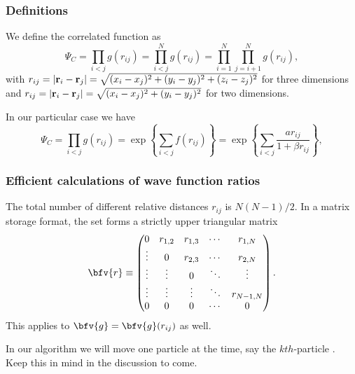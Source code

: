 \frame
 {
   \frametitle{Definitions}
 \begin{small}
 {\scriptsize
We define the correlated function as
\[
\Psi_C=\prod_{i< j}g(r_{ij})=\prod_{i< j}^Ng(r_{ij})= \prod_{i=1}^N\prod_{j=i+1}^Ng(r_{ij}),
\]
with 
$r_{ij}=|{\bf r}_i-{\bf r}_j|=\sqrt{(x_i-x_j)^2+(y_i-y_j)^2+(z_i-z_j)^2}$ for three dimensions and
$r_{ij}=|{\bf r}_i-{\bf r}_j|=\sqrt{(x_i-x_j)^2+(y_i-y_j)^2}$ for two dimensions.

In our particular case we have
\[
\Psi_C=\prod_{i< j}g(r_{ij})=\exp{\left\{\sum_{i<j}f(r_{ij})\right\}}=
\exp{\left\{\sum_{i<j}\frac{ar_{ij}}{1+\beta r_{ij}}\right\}},
\]
 }
 \end{small}
 }





\frame
 {
   \frametitle{Efficient calculations of wave function ratios}
 \begin{small}
 {\scriptsize

The total number of different relative distances $r_{ij}$ is $N(N-1)/2$. In a matrix storage format, the set forms a strictly upper triangular matrix
\begin{equation}\label{utrij}
 \bfv{r} \equiv \begin{pmatrix}
  0 & r_{1,2} & r_{1,3} & \cdots & r_{1,N} \\
  \vdots & 0       & r_{2,3} & \cdots & r_{2,N} \\
  \vdots & \vdots  & 0  & \ddots & \vdots  \\
  \vdots & \vdots  & \vdots  & \ddots  & r_{N-1,N} \\
  0 & 0  & 0  & \cdots  & 0
 \end{pmatrix}.
\end{equation}
This applies to  $\bfv{g} = \bfv{g}(r_{ij})$ as well. 

In our algorithm we will move one particle  at the time, say the $kth$-particle . Keep this in mind in the discussion to come.
 }
 \end{small}
 }


